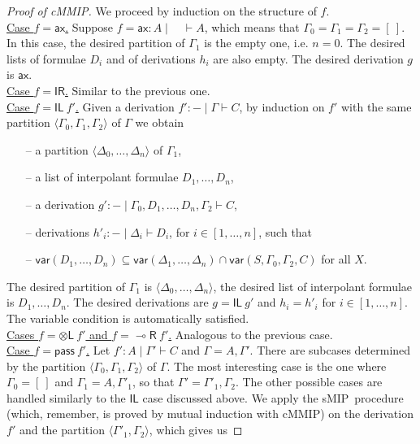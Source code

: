 \documentclass[sn-mathphys-num]{sn-jnl}%
\newcommand{\GG}{\Gamma}
\newcommand{\GD}{\Delta}
\newcommand{\vd}{\vdash}
\newcommand{\tl}{\otimes \mathsf{L}}
\newcommand{\pass}{\mathsf{pass}}
\newcommand{\unitl}{\mathsf{IL}}
\newcommand{\unitr}{\mathsf{IR}}
\newcommand{\ax}{\mathsf{ax}}
\newcommand{\lolli}{\multimap}
\newcommand{\lright}{{\lolli}\mathsf{R}}
\newcommand{\mf}[1]{\mathsf{#1}}
\newcommand{\gs}[1]{\sigma_{X} (#1)}
\newcommand{\vars}[1]{\mf{var} (#1)}
\newcommand{\sMIP}{\textsf{sMIP}}
\newcommand{\cMMIP}{\textsf{cMMIP}}
\theoremstyle{thmstyleone}%
\theoremstyle{thmstyletwo}%
\theoremstyle{thmstylethree}%
\begin{document}
\begin{proof}[Proof of \cMMIP]
  We proceed by induction on the structure of $f$. 
  \\
  \underline{Case $f  = \ax$.}
  Suppose $f = \ax : A \mid \quad \vd A$, which means that $\GG_0 = \GG_1 = \GG_2 = [\ ]$.
  In this case, the desired partition of $\GG_1$ is the empty one, i.e. $n=0$. The desired lists of formulae $D_i$ and of derivations $h_i$ are also empty. The desired derivation $g$ is $\ax$.
  \\
  \underline{Case $f = \unitr$.} Similar to the previous one.
  \\
  \underline{Case $f = \unitl \ f'$.}
  Given a derivation $f' : {-} \mid \GG \vd C$, by induction on $f'$ with the same partition $\langle \GG_0, \GG_1, \GG_2 \rangle$ of $\GG$ we obtain  
  \begin{itemize}
    \item[--] a partition $\langle \GD_0, \dots , \GD_n \rangle$ of $\GG_1$, 
    \item[--] a list of interpolant formulae $D_1, \dots , D_n$,
    \item[--] a derivation $g' : {-} \mid \GG_0 , D_1 , \dots , D_n , \GG_2 \vd C$,
    \item[--] derivations $h'_i : {-} \mid \GD_i \vd D_i$, for $i \in [1,\dots , n]$, such that
    \item[--] $\vars{D_1, \dots, D_n} \subseteq \vars{\GD_1 , \dots , \GD_n} \cap \vars{S, \GG_0, \GG_2, C}$ for all  $X$.
  \end{itemize}
  The desired partition of $\GG_1$ is $\langle \GD_0, \dots , \GD_n \rangle$, the desired list of interpolant formulae is $D_1,\dots,D_n$.
  The desired derivations are $g = \unitl \ g'$ and $h_i = h'_i$ for $i \in [1,\dots , n]$.
  The variable condition is automatically satisfied.
  \\
  \underline{Cases $f = \tl \ f'$ and $f = \lright \ f'$.} Analogous to the previous case.
  \\
  \underline{Case $f = \pass \ f'$.}
  Let $f' : A \mid \GG' \vd C$ and $\GG = A,\GG'$. There are subcases determined by the partition $\langle \GG_0,\GG_1,\GG_2 \rangle$ of $\GG$.
  The most interesting case is the one where $\GG_0 = [\ ]$ and $\GG_1 = A,\GG'_1$, so that $\GG' = \GG'_1,\GG_2$. The other possible cases are handled similarly to the $\unitl$ case discussed above.
  We apply the \sMIP~procedure (which, remember, is proved by mutual induction with \cMMIP) on the derivation $f'$ and the partition $\langle \GG'_1,\GG_2 \rangle$, which gives us

\end{proof}
\end{document}
